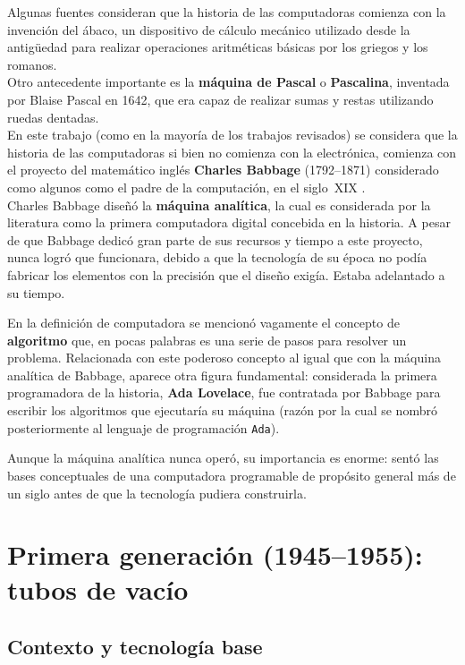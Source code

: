 \documentclass[10pt,letterpaper,twocolumn]{article}
\begin{document}
Algunas fuentes consideran que la historia de las computadoras comienza con la
invención del ábaco, un dispositivo de cálculo mecánico utilizado desde la 
antigüedad para realizar operaciones aritméticas básicas por los griegos y los
romanos. \\
Otro antecedente importante es la \textbf{máquina de Pascal} o 
\textbf{Pascalina}, 
inventada por Blaise Pascal en 1642, que era capaz de realizar sumas y restas 
utilizando ruedas dentadas. \\ 
En este trabajo (como en la mayoría de los trabajos revisados) se considera que 
la historia de las computadoras si bien no comienza con la electrónica, 
comienza con el proyecto del matemático inglés 
\textbf{Charles Babbage} (1792--1871) considerado como algunos 
como el padre de la computación, en el siglo~XIX . \\ 
Charles Babbage diseñó la \textbf{máquina analítica}, la cual es 
considerada por la literatura como la primera computadora digital concebida en 
la historia. A pesar de que Babbage dedicó gran parte de sus recursos y tiempo 
a este proyecto, nunca logró que funcionara, debido a que la tecnología de su 
época no podía fabricar los elementos con la precisión que el diseño exigía. 
Estaba adelantado a su tiempo.

En la definición de computadora se mencionó vagamente el concepto de 
\textbf{algoritmo} que, en pocas palabras es una serie de pasos para resolver 
un problema. Relacionada con este poderoso concepto al igual que con la máquina 
analítica de Babbage, aparece otra figura fundamental: considerada la primera 
programadora de la historia, \textbf{Ada Lovelace}, fue contratada por Babbage 
para escribir los algoritmos que ejecutaría su máquina (razón por la cual se 
nombró posteriormente al lenguaje de programación \texttt{Ada}). 

Aunque la máquina analítica nunca operó, su importancia es enorme: sentó
las bases conceptuales de una computadora programable de propósito general
más de un siglo antes de que la tecnología pudiera construirla.

\section{Primera generación (1945--1955): tubos de vacío}

\subsection{Contexto y tecnología base}
\end{document}
